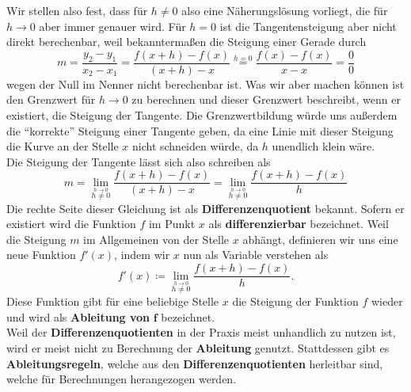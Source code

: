 \documentclass[../../main.tex]{subfiles}
\begin{document}
    Wir stellen also fest, dass für $h\neq 0$ also eine Näherungslösung vorliegt, die für $h\to 0$ aber immer genauer wird. Für $h=0$ ist die Tangentensteigung aber nicht direkt berechenbar, weil bekanntermaßen die Steigung einer Gerade durch
    $$m = \frac{y_2 - y_1}{x_2 - x_1} = \frac{f(x+h) - f(x)}{(x+h)-x} \stackrel{h=0}{=} \frac{f(x) - f(x)}{x-x} = \frac{0}{0}$$
    wegen der Null im Nenner nicht berechenbar ist. Was wir aber machen können ist den Grenzwert für $h\to 0$ zu berechnen und dieser Grenzwert beschreibt, wenn er existiert, die Steigung der Tangente. Die Grenzwertbildung würde uns außerdem die \enquote{korrekte} Steigung einer Tangente geben, da eine Linie mit dieser Steigung die Kurve an der Stelle $x$ nicht schneiden würde, da $h$ unendlich klein wäre.\\
    Die Steigung der Tangente lässt sich also schreiben als
    $$m = \lim\limits_{\stackrel{h\to 0}{h\neq 0}} \frac{f(x+h) - f(x)}{(x+h) - x} = \lim\limits_{\stackrel{h\to 0}{h\neq 0}} \frac{f(x+h) - f(x)}{h}$$
    Die rechte Seite dieser Gleichung ist als \textbf{Differenzenquotient} bekannt. Sofern er existiert wird die Funktion $f$ im Punkt $x$ als \textbf{differenzierbar} bezeichnet. Weil die Steigung $m$ im Allgemeinen von der Stelle $x$ abhängt, definieren wir uns eine neue Funktion $f'(x)$, indem wir $x$ nun als Variable verstehen als
    $$\boxed{f'(x) \coloneqq \lim\limits_{\stackrel{h\to 0}{h\neq 0}} \frac{f(x+h) - f(x)}{h}}.$$
    Diese Funktion gibt für eine beliebige Stelle $x$ die Steigung der Funktion $f$ wieder und wird als \textbf{Ableitung von} $\boldsymbol{f}$ bezeichnet.\\
    Weil der \textbf{Differenzenquotienten} in der Praxis meist unhandlich zu nutzen ist, wird er meist nicht zu Berechnung der \textbf{Ableitung} genutzt. Stattdessen gibt es \textbf{Ableitungsregeln}, welche aus den \textbf{Differenzenquotienten} herleitbar sind, welche für Berechnungen herangezogen werden.\\
    
\end{document}
